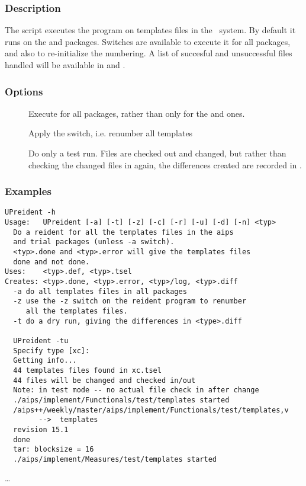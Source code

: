 \subsubsection*{Description}

\noindent
The  script executes the  program on templates
files in the \aipspp\ system. By default it runs on the  and
 packages. Switches are available to execute it for all packages,
and also to re-initialize the numbering. A list of succesful and unsuccessful
files handled will be available in  and .

\subsubsection*{Options}

\begin{description}
\item[]
    Execute for all packages, rather than only for the  and
     ones.
\item[]
    Apply the  switch, i.e. renumber all templates
\item[]
    Do only a test run. Files are checked out and changed, but rather than
    checking the changed files in again, the differences created are recorded
    in .
\end{description}

\subsubsection*{Examples}

\begin{verbatim}
UPreident -h
Usage:   UPreident [-a] [-t] [-z] [-c] [-r] [-u] [-d] [-n] <typ>
  Do a reident for all the templates files in the aips
  and trial packages (unless -a switch).
  <typ>.done and <typ>.error will give the templates files
  done and not done.
Uses:    <typ>.def, <typ>.tsel
Creates: <typ>.done, <typ>.error, <typ>/log, <typ>.diff
  -a do all templates files in all packages
  -z use the -z switch on the reident program to renumber 
     all the templates files.
  -t do a dry run, giving the differences in <type>.diff

  UPreident -tu
  Specify type [xc]: 
  Getting info...
  44 templates files found in xc.tsel
  44 files will be changed and checked in/out
  Note: in test mode -- no actual file check in after change
  ./aips/implement/Functionals/test/templates started
  /aips++/weekly/master/aips/implement/Functionals/test/templates,v  
		-->  templates
  revision 15.1
  done
  tar: blocksize = 16
  ./aips/implement/Measures/test/templates started
\end{verbatim}
\ldots

